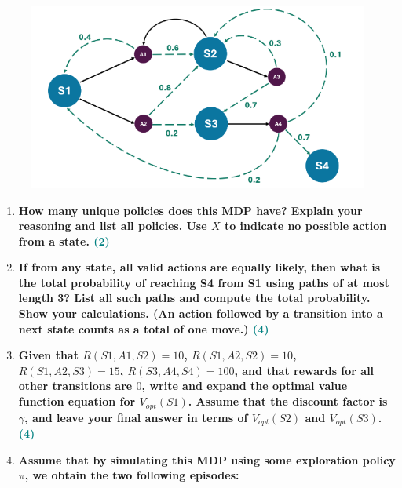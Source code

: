 \documentclass[a4paper]{article}
\begin{document}
\begin{sloppypar}
\begin{figure}[H]
    \centering  
    \includegraphics[height=0.3\textheight]{mdp_and_rl.png}
    \label{fig:mdp_and_rl}
\end{figure}

\begin{enumerate}[start=8,label=Q\arabic*,left=0pt]
    \item \textbf{How many unique policies does this MDP have? Explain your reasoning and list all policies. Use $X$ to indicate no possible action from a state. \hfill \textcolor{teal}{(2)}}
    
    \par 
    
    \item \textbf{If from any state, all valid actions are equally likely, then what is the total probability
    of reaching S4 from S1 using paths of at most length 3? List all such paths and compute
    the total probability. Show your calculations. (An action followed by a transition into a next
    state counts as a total of one move.) \hfill \textcolor{teal}{(4)}}
    
    \par

    \item \textbf{Given that $R(S1, A1, S2) = 10$, $R(S1, A2, S2) = 10$, $R(S1, A2, S3) = 15$, $R(S3, A4, S4) = 100$, 
    and that rewards for all other transitions are $0$, write and expand the optimal value
    function equation for $V_{opt}(S1)$. Assume that the discount factor is $\gamma$, and leave your final
    answer in terms of $V_{opt}(S2)$ and $V_{opt}(S3)$. \hfill \textcolor{teal}{(4)}}
    
    \par 

    \item \textbf{Assume that by simulating this MDP using some exploration policy $\pi$, we obtain the
    two following episodes:}


\end{enumerate}
\end{sloppypar}
\end{document}
